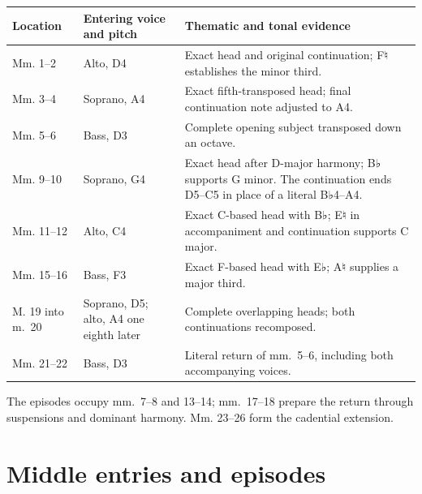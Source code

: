 \documentclass[11pt,a4paper]{article}
\begin{document}
{\def\LTcaptype{table}
\par\addvspace{\LTpre}
{\small\noindent
\begin{tabular}{@{}
  >{\raggedright\arraybackslash}p{}
  >{\raggedright\arraybackslash}p{}
  >{\raggedright\arraybackslash}p{}@{}}
\toprule\noalign{}
\begin{minipage}[b]{\linewidth}\raggedright
Location
\end{minipage} & \begin{minipage}[b]{\linewidth}\raggedright
Entering voice and pitch
\end{minipage} & \begin{minipage}[b]{\linewidth}\raggedright
Thematic and tonal evidence
\end{minipage} \\
\midrule\noalign{}

Mm. 1--2 & Alto, D4 & Exact head and original continuation; F♮ establishes the minor third. \\
Mm. 3--4 & Soprano, A4 & Exact fifth-transposed head; final continuation note adjusted to A4. \\
Mm. 5--6 & Bass, D3 & Complete opening subject transposed down an octave. \\
Mm. 9--10 & Soprano, G4 & Exact head after D-major harmony; B♭ supports G minor. The continuation ends D5--C5 in place of a literal B♭4--A4. \\
Mm. 11--12 & Alto, C4 & Exact C-based head with B♭; E♮ in accompaniment and continuation supports C major. \\
Mm. 15--16 & Bass, F3 & Exact F-based head with E♭; A♮ supplies a major third. \\
M. 19 into m.~20 & Soprano, D5; alto, A4 one eighth later & Complete overlapping heads; both continuations recomposed. \\
Mm. 21--22 & Bass, D3 & Literal return of mm.~5--6, including both accompanying voices. \\
\bottomrule
\end{tabular}
\par}
\addvspace{\LTpost}
}

The episodes occupy mm.~7--8 and 13--14; mm.~17--18 prepare the return through suspensions and dominant harmony. Mm. 23--26 form the cadential extension.

\section{Middle entries and episodes}\label{middle-entries-and-episodes}
\end{document}
